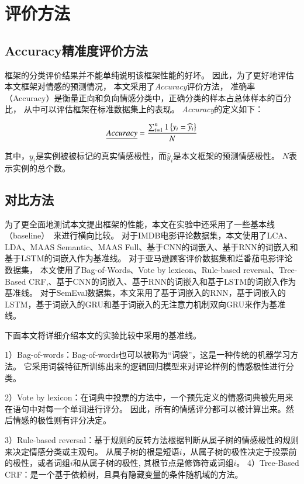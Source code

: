 \section{评价方法}

\subsection{Accuracy精准度评价方法}

框架的分类评价结果并不能单纯说明该框架性能的好坏。
因此，为了更好地评估本文框架对情感的预测情况，
本文采用了\emph{Accuracy}评价方法，
准确率（Accuracy）是衡量正向和负向情感分类中，正确分类的样本占总体样本的百分比，
从中可以评估框架在标准数据集上的表现。
\emph{Accuracy}的定义如下：

\begin{equation}
\emph{Accuracy}=\frac{\sum_{i=1}^{n}1\left\{y_{i}=\widehat{y}_{i}\right\}}{N}
\end{equation}

其中，${y_{i}}$是实例被被标记的真实情感极性，而${\widehat{y}_{i}}$是本文框架的预测情感极性。
${N}$表示实例的总个数。

\subsection{对比方法}

为了更全面地测试本文提出框架的性能，本文在实验中还采用了一些基本线（baseline）~来进行横向比较。
对于IMDB电影评论数据集，本文使用了LCA、LDA、MAAS Semantic、MAAS Full、基于CNN的词嵌入、基于RNN的词嵌入和基于LSTM的词嵌入作为基准线。
对于亚马逊顾客评价数据集和烂番茄电影评论数据集，
本文使用了Bag-of-Words、Vote by lexicon、Rule-based reversal、Tree-Based CRF,、基于CNN的词嵌入、基于RNN的词嵌入和基于LSTM的词嵌入作为基准线。
对于SemEval数据集，本文采用了基于词嵌入的RNN，基于词嵌入的LSTM，基于词嵌入的GRU和基于词嵌入的无注意力机制双向GRU来作为基准线。

下面本文将详细介绍本文的实验比较中采用的基准线。

1）Bag-of-words：Bag-of-words也可以被称为“词袋”，这是一种传统的机器学习方法。
    它采用词袋特征所训练出来的逻辑回归模型来对评论样例的情感极性进行分类。

2）Vote by lexicon：在词典中投票的方法中，一个预先定义的情感词典被先用来在语句中对每一个单词进行评分。
    因此，所有的情感评分都可以被计算出来。然后情感的极性则有评分决定。

3）Rule-based reversal：基于规则的反转方法根据判断从属子树的情感极性的规则来决定情感分类或主观句。
    从属子树的根是短语${i}$，从属子树的极性决定于投票前的极性，或者词组${i}$和从属子树的极性, 其根节点是修饰符或词组${i}$。
4）Tree-Based CRF：是一个基于依赖树，且具有隐藏变量的条件随机域的方法。

